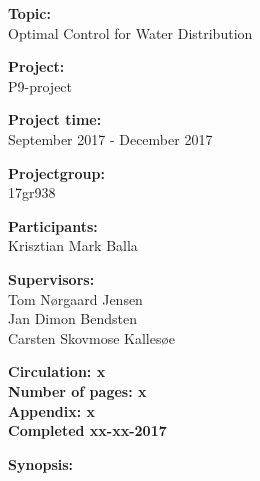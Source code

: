 \begin{minipage}[t]{0.48\textwidth}
\textbf{Topic:} \\[5pt]\bigskip\hspace{2ex}
Optimal Control for Water Distribution

\textbf{Project:} \\[5pt]\bigskip\hspace{2ex}
P9-project

\textbf{Project time:} \\[5pt]\bigskip\hspace{2ex}
September 2017 - December 2017

\textbf{Projectgroup:} \\[5pt]\bigskip\hspace{2ex}
17gr938	

\textbf{Participants:} \\[5pt]\hspace*{2ex}
Krisztian Mark Balla \\\hspace*{2ex}

\textbf{Supervisors:} \\[5pt]\hspace*{2ex}
Tom Nørgaard Jensen \\\hspace*{2ex}
Jan Dimon Bendsten \\\hspace*{2ex}
Carsten Skovmose Kallesøe \\\bigskip\hspace{2ex}

\vspace*{3.5cm}

\textbf{Circulation: x} \\
\textbf{Number of pages: x}\\
\textbf{Appendix: x } \\
\textbf{Completed xx-xx-2017}\\
\end{minipage}
\hfill
\begin{minipage}[t]{0.483\textwidth}
\textbf{Synopsis:} \\[5pt]
\fbox{\parbox{7cm}{\bigskip\bigskip}}
\end{minipage}

\vfill